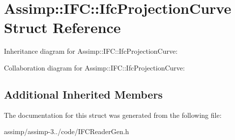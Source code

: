 \hypertarget{struct_assimp_1_1_i_f_c_1_1_ifc_projection_curve}{\section{Assimp\+:\+:I\+F\+C\+:\+:Ifc\+Projection\+Curve Struct Reference}
\label{struct_assimp_1_1_i_f_c_1_1_ifc_projection_curve}
}


Inheritance diagram for Assimp\+:\+:I\+F\+C\+:\+:Ifc\+Projection\+Curve\+:


Collaboration diagram for Assimp\+:\+:I\+F\+C\+:\+:Ifc\+Projection\+Curve\+:
\subsection*{Additional Inherited Members}


The documentation for this struct was generated from the following file\+:\begin{DoxyCompactItemize}
\item 
assimp/assimp-\/3../code/I\+F\+C\+Reader\+Gen.\+h\end{DoxyCompactItemize}
